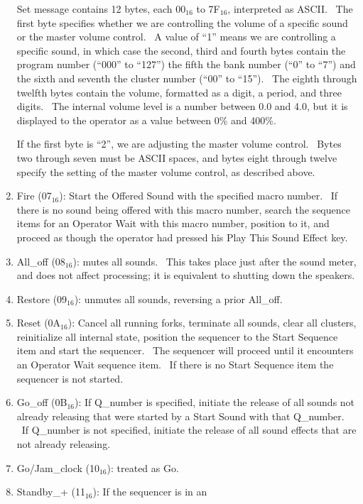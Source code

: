 \documentclass[letterpaper]{article}
\newcommand\textsubscript[1]{\ensuremath{{}_{\text{#1}}}}
\begin{document}
\begin{enumerate}
Set message contains 12 bytes, each 00\textsubscript{16} to
7F\textsubscript{16}, interpreted as ASCII. \ The first byte specifies
whether we are controlling the volume of a specific sound or the master
volume control. \ A value of “1” means we are controlling a specific
sound, in which case the second, third and fourth bytes contain the
program number (“000” to “127”) the fifth the bank number (“0” to “7”)
and the sixth and seventh the cluster number (“00” to “15”). \ The
eighth through twelfth bytes contain the volume, formatted as a digit,
a period, and three digits. \ The internal volume level is a number
between 0.0 and 4.0, but it is displayed to the operator as a value
between 0\% and 400\%.

If the first byte is “2”, we are adjusting the master volume control.
\ Bytes two through seven must be ASCII spaces, and bytes eight through
twelve specify the setting of the master volume control, as described
above.
\item Fire (07\textsubscript{16}): Start the Offered Sound with the
specified macro number. \ If there is no sound being offered with this
macro number, search the sequence items for an Operator Wait with this
macro number, position to it, and proceed as though the operator had
pressed his Play This Sound Effect key.
\item All\_off (08\textsubscript{16}): mutes all sounds. \ This takes
place just after the sound meter, and does not affect processing; it is
equivalent to shutting down the speakers.
\item Restore (09\textsubscript{16}): unmutes all sounds, reversing a
prior All\_off.
\item Reset (0A\textsubscript{16}): Cancel all running forks, terminate
all sounds, clear all clusters, reinitialize all internal state,
position the sequencer to the Start Sequence item and start the
sequencer. \ The sequencer will proceed until it encounters an Operator
Wait sequence item. \ If there is no Start Sequence item the sequencer
is not started.
\item Go\_off (0B\textsubscript{16}): If Q\_number is specified,
initiate the release of all sounds not already releasing that were
started by a Start Sound with that Q\_number. \ If Q\_number is not
specified, initiate the release of all sound effects that are not
already releasing.
\item Go/Jam\_clock (10\textsubscript{16}): treated as Go.
\item Standby\_+ (11\textsubscript{16}): If the sequencer is in an

\end{enumerate}
\end{document}
